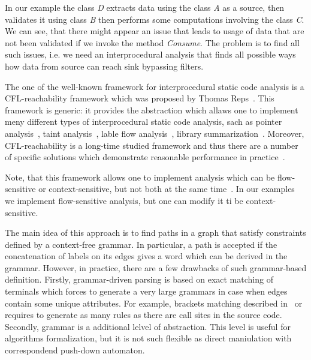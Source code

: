 In our example the class \textit{D} extracts data using the class \textit{A} as a source, then validates it using class \textit{B} then performs some computations involving the class \textit{C}.
We can see, that there might appear an issue that leads to usage of data that are not been validated if we invoke the method \textit{Consume}.
The problem is to find all such issues, i.e. we need an interprocedural analysis that finds all possible ways how data from source can reach sink bypassing filters.

The one of the well-known framework for interprocedural static code analysis is a CFL-reachability framework which was proposed by Thomas Reps~\cite{Reps}.
This framework is generic: it provides the abstraction which allaws one to implement meny different types of interprocedural static code analysis, sach as pointer analysis~\cite{Zheng, JavaCFL}, taint analysis~\cite{Huang:2015:SPT:2771783.2771803}, lable flow analysis~\cite{10.1007/11823230_7,CFLr}, library summarization~\cite{10.1007/978-3-662-54434-1_33}.
Moreover, CFL-reachability is a long-time studied framework and thus there are a number of specific solutions which demonstrate reasonable performance in practice~\cite{Wang:2017:GSD:3093315.3037744}.

Note, that this framework allows one to implement analysis which can be flow-sensitive or context-sensitive, but not both at the same time~\cite{Reps:2000:UCD:345099.345137}. In our examples we implement flow-sensitive analysis, but one can modify it ti be context-sensitive.

The main idea of this approach is to find paths in a graph that satisfy constraints defined by a context-free grammar.
In particular, a path is accepted if the concatenation of labels on its edges gives a word which can be derived in the grammar.
However, in practice, there are a few drawbacks of such grammar-based definition.
Firstly, grammar-driven parsing is based on exact matching of terminals which forces to generate a very large grammars in case when edges contain some unique attributes.
For example, brackets matching described in~\cite{CFLr} or~\cite{Zheng, JavaCFL} requires to generate as many rules as there are call sites in the source code.
Secondly, grammar is a additional lelvel of abstraction.
This level is useful for algorithms formalization, but it is not such flexible as direct maniulation with correspondend push-down automaton.

